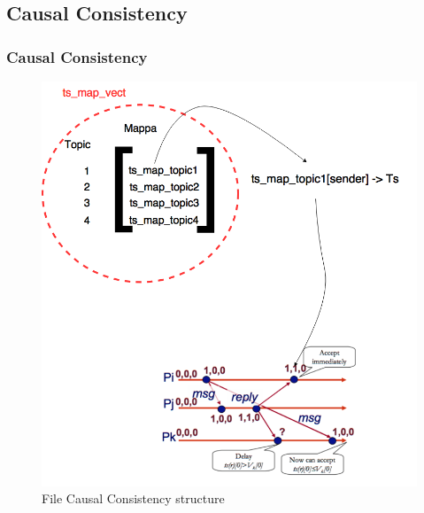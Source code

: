 \documentclass{beamer}
\begin{document}
\subsection{Causal Consistency}
\begin{frame}
	\frametitle{Causal Consistency}
	
		\begin{figure}[h!]
			\centering
			\includegraphics{Risorse/cc.png} %
			\caption{File Causal Consistency structure}
		\end{figure}
		
\end{frame}
\end{document}
